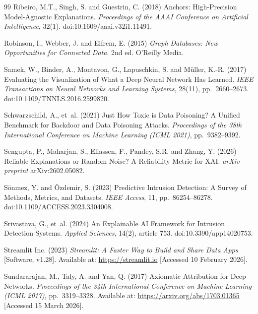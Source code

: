 \documentclass[12pt,a4paper]{report}
\begin{document}
\begin{thebibliography}{99}
Ribeiro, M.T., Singh, S. and Guestrin, C. (2018) Anchors: High-Precision Model-Agnostic Explanations. \textit{Proceedings of the AAAI Conference on Artificial Intelligence}, 32(1). doi:10.1609/aaai.v32i1.11491.

Robinson, I., Webber, J. and Eifrem, E. (2015) \textit{Graph Databases: New Opportunities for Connected Data}. 2nd ed. O'Reilly Media.

Samek, W., Binder, A., Montavon, G., Lapuschkin, S. and M\"{u}ller, K.-R. (2017) Evaluating the Visualization of What a Deep Neural Network Has Learned. \textit{IEEE Transactions on Neural Networks and Learning Systems}, 28(11), pp.~2660--2673. doi:10.1109/TNNLS.2016.2599820.

Schwarzschild, A., et~al. (2021) Just How Toxic is Data Poisoning? A Unified Benchmark for Backdoor and Data Poisoning Attacks. \textit{Proceedings of the 38th International Conference on Machine Learning (ICML 2021)}, pp.~9382--9392.

Sengupta, P., Maharjan, S., Eliassen, F., Pandey, S.R. and Zhang, Y. (2026) Reliable Explanations or Random Noise? A Reliability Metric for XAI. \textit{arXiv preprint} arXiv:2602.05082.

S\"{o}nmez, Y. and \"{O}zdemir, S. (2023) Predictive Intrusion Detection: A Survey of Methods, Metrics, and Datasets. \textit{IEEE Access}, 11, pp.~86254--86278. doi:10.1109/ACCESS.2023.3304008.

Srivastava, G., et~al. (2024) An Explainable AI Framework for Intrusion Detection Systems. \textit{Applied Sciences}, 14(2), article 753. doi:10.3390/app14020753.

Streamlit Inc. (2023) \textit{Streamlit: A Faster Way to Build and Share Data Apps} [Software, v1.28]. Available at: \url{https://streamlit.io} [Accessed 10 February 2026].

Sundararajan, M., Taly, A. and Yan, Q. (2017) Axiomatic Attribution for Deep Networks. \textit{Proceedings of the 34th International Conference on Machine Learning (ICML 2017)}, pp.~3319--3328. Available at: \url{https://arxiv.org/abs/1703.01365} [Accessed 15 March 2026].


\end{thebibliography}
\end{document}
